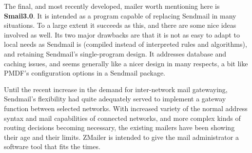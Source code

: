 The final, and most recently developed, mailer worth mentioning here is
{\bf Smail3.0}.
It is intended as a program capable of replacing Sendmail in many
situations. To a large extent it succeeds as this, and there are some nice
ideas involved as well. Its two major drawbacks are that it is not as easy
to adapt to local needs as Sendmail is (compiled instead of interpreted
rules and algorithms), and retaining Sendmail's single-program design.  It
addresses database and caching issues, and seems generally like a nicer
design in many respects, a bit like PMDF's configuration options in a
Sendmail package.

Until the recent increase in the demand for inter-network mail gatewaying,
Sendmail's flexibility had quite adequately served to implement a gateway
function between selected networks.  With increased variety of the normal
address syntax and mail capabilities of connected networks, and more complex
kinds of routing decisions becoming necessary, the existing mailers have
been showing their age and their limits.  ZMailer is intended to give the
mail administrator a software tool that fits the times.
